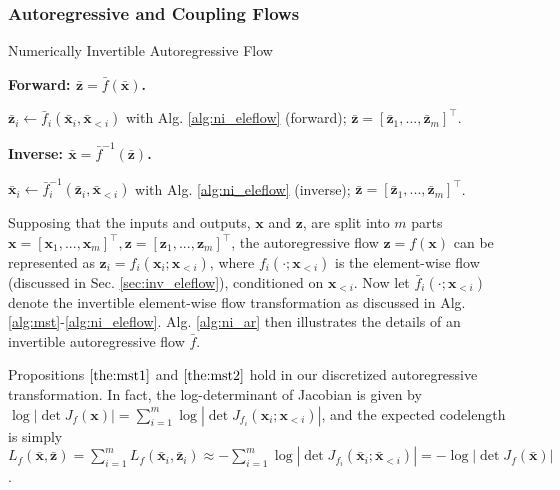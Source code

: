 \documentclass{article}
\newcommand{\qv}[1]{\bar{\mathbf{#1}}}
\begin{document}
\subsubsection{Autoregressive and Coupling Flows}

\begin{algorithm}[h]
\small
\caption{Numerically Invertible Autoregressive Flow}
\begin{multicols}{2} 
\textbf{Forward: $\qv{z} = \bar{f} (\qv{x})$.} 

\begin{algorithmic}[1]
\STATE $\qv{z}_i \gets \bar{f}_i (\qv{x}_i, \qv{x}_{< i})$ with Alg. \ref{alg:ni_eleflow} (forward);
\ENDFOR
\RETURN $\qv{z} = [\qv{z}_1, ..., \qv{z}_m]^\top$.
\end{algorithmic}

\textbf{Inverse: $\qv{x} = \bar{f}^{-1} (\qv{z})$.} 

\begin{algorithmic}[1]
\STATE $\qv{x}_i \gets \bar{f}^{-1}_i (\qv{z}_i, \qv{x}_{< i})$ with Alg. \ref{alg:ni_eleflow} (inverse);
\ENDFOR
\RETURN $\qv{z} = [\qv{z}_1, ..., \qv{z}_m]^\top$.
\end{algorithmic}
\end{multicols}
\vspace{-8pt}
\label{alg:ni_ar}
\end{algorithm}

Supposing that the inputs and outputs, $\mathbf{x}$ and $\mathbf{z}$, are split into $m$ parts $\mathbf{x} = [\mathbf{x}_1, ..., \mathbf{x}_m]^\top, \mathbf{z} = [\mathbf{z}_1, ..., \mathbf{z}_m]^\top$, the autoregressive flow $\mathbf{z} = f(\mathbf{x})$ can be represented as $\mathbf{z}_i = f_i (\mathbf{x}_i; \mathbf{x}_{<i})$, where $ f_i (\cdot; \mathbf{x}_{<i})$ is the element-wise flow (discussed in Sec. \ref{sec:inv_eleflow}), conditioned on $\mathbf{x}_{<i}$. Now let $\bar{f}_i (\cdot; \mathbf{x}_{<i})$ denote the invertible element-wise flow transformation as discussed in Alg. \ref{alg:mst}-\ref{alg:ni_eleflow}. Alg. \ref{alg:ni_ar} then illustrates the details of an invertible autoregressive flow $\bar{f}$.

Propositions $\ref{the:mst1}$ and $\ref{the:mst2}$ hold in our discretized autoregressive transformation. In fact, the log-determinant of Jacobian is given by $\log |\det J_f(\mathbf{x})| = \sum_{i=1}^m \log |\det J_{f_i} (\mathbf{x}_i; \mathbf{x}_{<i})|$, and the expected codelength is simply $L_f(\qv{x}, \qv{z}) = \sum_{i=1}^m L_f (\qv{x}_i, \qv{z}_i) \approx -\sum_{i=1}^m \log |\det J_{f_i} (\qv{x}_i; \qv{x}_{<i})| = -\log |\det J_f(\qv{x})|$.
\end{document}

